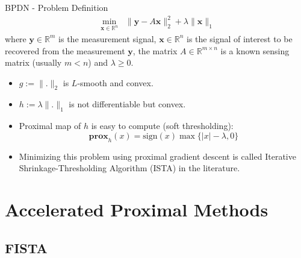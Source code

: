\documentclass{beamer}
\begin{document}
\begin{frame}{BPDN - Problem Definition}
\begin{align*}
    \min_{\mathbf{x}\in\mathbb{R}^n}\;\; \|\mathbf{y}-A\mathbf{x}\|_2^2+\lambda \|\mathbf{x}\|_1
\end{align*}
where $\mathbf{y}\in\mathbb{R}^m$ is the measurement signal, $\mathbf{x}\in \mathbb{R}^n$ is the signal of interest to be recovered from the measurement $\mathbf{y}$, the matrix $A\in\mathbb{R}^{m\times n}$ is a known sensing matrix (usually $m<n$) and $\lambda\geq0$.\\
\vspace{5pt}
\begin{itemize}
    \pause
    \item $g:=\|.\|_2$ is $L$-smooth and convex.
    \pause
    \item $h:=\lambda\|.\|_1$ is not differentiable but convex.
    \pause
    \item Proximal map of $h$ is easy to compute (soft thresholding):
    \begin{equation*}
        \mathbf{prox}_{h}(x)=\mathrm{sign}(x)\max\{|x|-\lambda, 0\}
    \end{equation*}
    \pause
    \item Minimizing this problem using proximal gradient descent is called {\color{rutgerscarlet}Iterative Shrinkage-Thresholding Algorithm} (ISTA) in the literature.
\end{itemize}
\end{frame}



\section{Accelerated Proximal Methods}


\subsection{FISTA}
\end{document}
